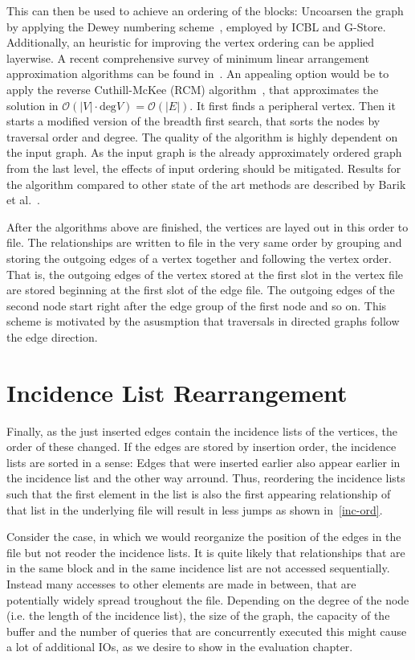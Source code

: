         This can then be used to achieve an ordering of the blocks:
        Uncoarsen the graph by applying the Dewey numbering scheme~\autocite{dewey1894decimal}, employed by ICBL and G-Store.
        Additionally, an heuristic for improving the vertex ordering can be applied layerwise. 
        A recent comprehensive survey of minimum linear arrangement approximation algorithms can be found in~\autocite{barik2020vertex}.
        An appealing option would be to apply the reverse Cuthill-McKee (RCM) algorithm~\autocite{Cuthill1969ReducingTB}, that approximates the solution in $\mathcal{O}(|V| \cdot \text{deg}{V}) = \mathcal{O}(|E|)$. 
        It first finds a peripheral vertex.
        Then it starts a modified version of the breadth first search, that sorts the nodes by traversal order and degree.
        The quality of the algorithm is highly dependent on the input graph.
        As the input graph is the already approximately ordered graph from the last level, the effects of input ordering should be mitigated.
        Results for the algorithm compared to other state of the art methods are described by Barik et al.~\autocite{barik2020vertex}.
        
        After the algorithms above are finished, the vertices are layed out in this order to file. 
        The relationships are written to file in the very same order by grouping and storing the outgoing edges of a vertex together and following the vertex order.
        That is, the outgoing edges of the vertex stored at the first slot in the vertex file are stored beginning at the first slot of the edge file. 
        The outgoing edges of the second node start right after the edge group of the first node and so on.
        This scheme is motivated by the asusmption that traversals in directed graphs follow the edge direction.
    
\section{Incidence List Rearrangement}\label{\positionnumber}
    Finally, as the just inserted edges contain the incidence lists of the vertices, the order of these changed.
    If the edges are stored by insertion order, the incidence lists are sorted in a sense: 
    Edges that were inserted earlier also appear earlier in the incidence list and the other way arround.
    Thus, reordering the incidence lists such that the first element in the list is also the first appearing relationship of that list in the underlying file will result in less jumps as shown in~\ref{inc-ord}.
    
    Consider the case, in which we would reorganize the position of the edges in the file but not reoder the incidence lists. 
    It is quite likely that relationships that are in the same block and in the same incidence list are not accessed sequentially.
    Instead many accesses to other elements are made in between, that are potentially widely spread troughout the file.
    Depending on the degree of the node (i.e. the length of the incidence list), the size of the graph, the capacity of the buffer and the number of queries that are concurrently executed this might cause a lot of additional IOs, as we desire to show in the evaluation chapter.

